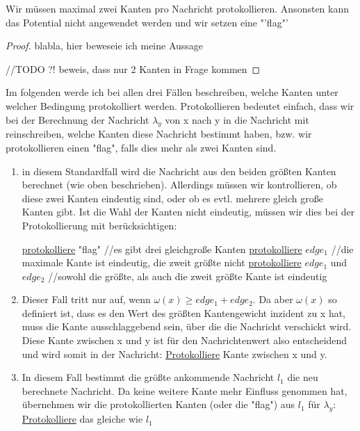 \begin{theorem}
	Wir müssen maximal zwei Kanten pro Nachricht protokollieren. Ansonsten kann das Potential nicht angewendet werden und wir setzen eine "'flag"'
\end{theorem}

\begin{proof}
	blabla, hier beweseie ich meine Aussage
	
	//TODO ?! beweis, dass nur 2 Kanten in Frage kommen
\end{proof}

Im folgenden werde ich bei allen drei Fällen beschreiben, welche Kanten unter welcher Bedingung protokolliert werden. Protokollieren bedeutet einfach, dass wir bei der Berechnung der Nachricht $\lambda_{y}$ von x nach y  in die Nachricht mit reinschreiben, welche Kanten diese Nachricht bestimmt haben, bzw. wir protokollieren einen "flag", falls dies mehr als zwei Kanten sind.

\begin{enumerate}[label=\alph*)]
	
	\item in diesem Standardfall wird die Nachricht aus den beiden größten Kanten berechnet (wie oben beschrieben). Allerdings müssen wir kontrollieren, ob diese zwei Kanten eindeutig sind, oder ob es evtl. mehrere gleich große Kanten gibt. Ist die Wahl der Kanten nicht eindeutig, müssen wir dies bei der Protokollierung mit berücksichtigen:\\
	
		\begin{algorithmic}
			\State \uline{protokolliere} "flag"
			\State//es gibt drei gleichgroße Kanten
			\State \uline{protokolliere} $edge_{1}$
			\State//die maximale Kante ist eindeutig, die zweit größte nicht
			\Else
			\State \uline{protokolliere} $edge_{1}$ und $edge_{2}$
			\State//sowohl die größte, als auch die zweit größte Kante ist eindeutig
			\EndIf
		\end{algorithmic}
	
	\item Dieser Fall tritt nur auf, wenn $\omega(x) \geq edge_{1}+edge_{2}$. Da aber $\omega(x)$ so definiert ist, dass es den Wert des größten Kantengewicht inzident zu x hat, muss die Kante ausschlaggebend sein, über die die Nachricht verschickt wird. 
	\\
	Diese Kante zwischen x und y ist für den Nachrichtenwert also entscheidend und wird somit in der Nachricht: \uline{Protokolliere} Kante zwischen x und y.
	
	\item In diesem Fall bestimmt die größte ankommende Nachricht $l_{1}$ die neu berechnete Nachricht. Da keine weitere Kante mehr Einfluss genommen hat, übernehmen wir die protokollierten Kanten (oder die "flag") aus $l_{1}$ für $\lambda_{y}$: \uline{Protokolliere} das gleiche wie $l_{1}$
	
\end{enumerate}

